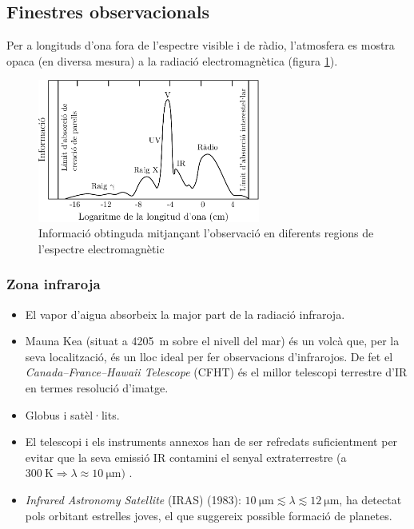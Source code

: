 \subsection{Finestres observacionals}
Per a longituds d'ona fora de l'espectre visible i de ràdio, l'atmosfera es mostra opaca (en diversa mesura) a la radiació electromagnètica (figura \ref{fig:observational-windows}).
\begin{figure}[H]
	\centering
	\includegraphics[width=0.65\textwidth]{./images/1-observational-windows}
	\caption{Informació obtinguda mitjançant l'observació en diferents regions de l'espectre electromagnètic}
	\label{fig:observational-windows}
\end{figure}

\subsubsection*{Zona infraroja}
\begin{itemize}
	\item El vapor d'aigua absorbeix la major part de la radiació infraroja.
	\item Mauna Kea (situat a \SI{4205}{\m} sobre el nivell del mar) és un volcà que, per la seva localització, és un lloc ideal per fer observacions d'infrarojos. De fet el \textit{Canada--France--Hawaii Telescope} (CFHT) és el millor telescopi terrestre d'IR en termes resolució d'imatge.
	\item Globus i satèl·lits.
	\item El telescopi i els instruments annexos han de ser refredats suficientment per evitar que la seva emissió IR contamini el senyal extraterrestre (a $\SI{300}{\K} \Rightarrow \lambda \approx \SI{10}{\micro\m})$ .
	\item \textit{Infrared Astronomy Satellite} (IRAS) (1983): $\SI{10}{\micro\m} \lesssim \lambda \lesssim \SI{12}{\micro\m}$, ha detectat pols orbitant estrelles joves, el que suggereix possible formació de planetes.
\end{itemize}

